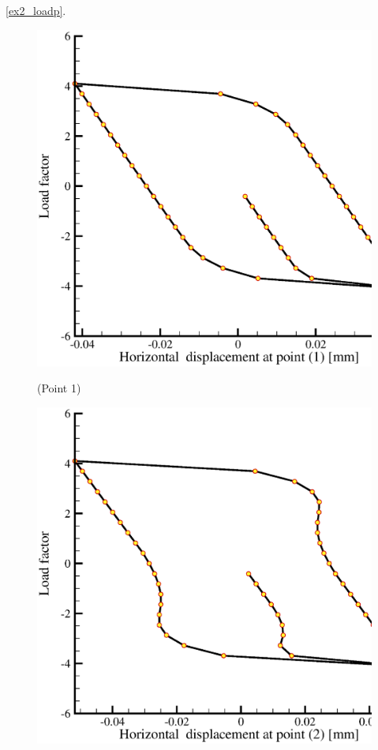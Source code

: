 \ref{ex2_loadp}.
\begin{figure}[!htb]
  \begin{center}
   \begin{minipage}[t]{0.48\textwidth}
     \begin{center}
    \includegraphics[scale=0.28]{M/ex1_load_v_ux_p1.eps}
    \centerline{(Point 1)}
    \end{center}
   \end{minipage}
   \hspace{0.02\textwidth}
   \begin{minipage}[t]{0.48\textwidth}
    \begin{center}
    \includegraphics[scale=0.28]{M/ex1_load_v_ux_p2.eps}\\

\end{center}
\end{minipage}
\end{center}
\end{figure}
